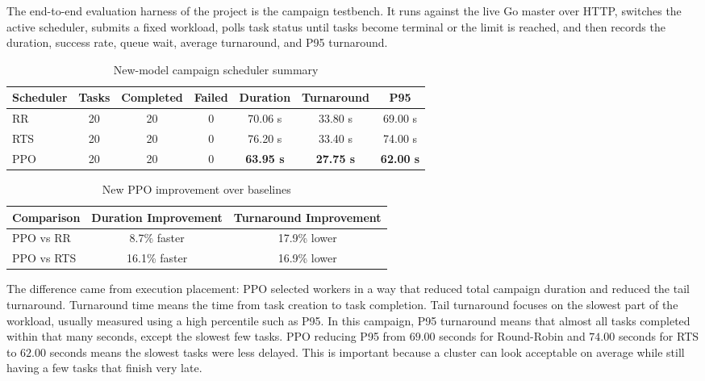 The end-to-end evaluation harness of the project is the campaign testbench. It runs against the live Go master over HTTP, switches the active scheduler, submits a fixed workload, polls task status until tasks become terminal or the limit is reached, and then records the duration, success rate, queue wait, average turnaround, and P95 turnaround.
\begin{table}[H]
\centering
\caption{New-model campaign scheduler summary}
\label{tab:latest_campaign}
\begin{tabular}{lcccccc}
\toprule
\textbf{Scheduler} & \textbf{Tasks} & \textbf{Completed} & \textbf{Failed} & \textbf{Duration} & \textbf{Turnaround} & \textbf{P95} \\
\midrule
RR & 20 & 20 & 0 & 70.06 s & 33.80 s & 69.00 s \\
RTS & 20 & 20 & 0 & 76.20 s & 33.40 s & 74.00 s \\
PPO & 20 & 20 & 0 & \textbf{63.95 s} & \textbf{27.75 s} & \textbf{62.00 s} \\
\bottomrule
\end{tabular}
\end{table}

\begin{table}[H]
\centering
\caption{New PPO improvement over baselines}
\label{tab:ppo_improvement}
\begin{tabular}{lcc}
\toprule
\textbf{Comparison} & \textbf{Duration Improvement} & \textbf{Turnaround Improvement} \\
\midrule
PPO vs RR & 8.7\% faster & 17.9\% lower \\
PPO vs RTS & 16.1\% faster & 16.9\% lower \\
\bottomrule
\end{tabular}
\end{table}

The difference came from execution placement: PPO selected workers in a way that reduced total campaign duration and reduced the tail turnaround. Turnaround time means the time from task creation to task completion. Tail turnaround focuses on the slowest part of the workload, usually measured using a high percentile such as P95. In this campaign, P95 turnaround means that almost all tasks completed within that many seconds, except the slowest few tasks. PPO reducing P95 from \(69.00\) seconds for Round-Robin and \(74.00\) seconds for RTS to \(62.00\) seconds means the slowest tasks were less delayed. This is important because a cluster can look acceptable on average while still having a few tasks that finish very late.

